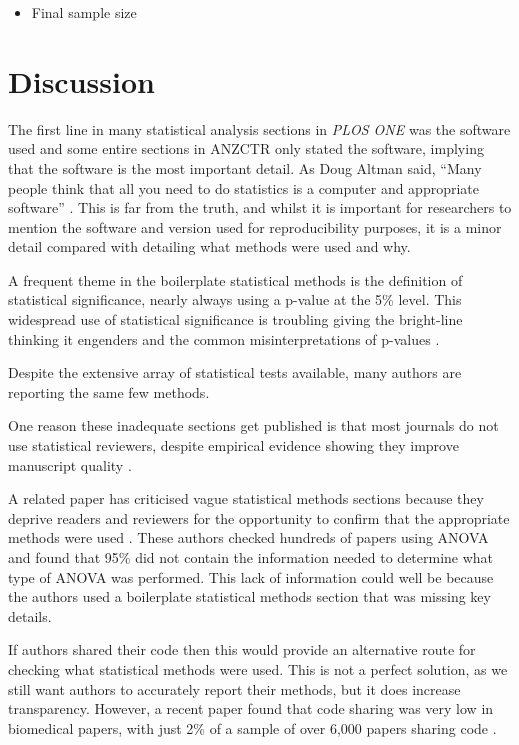 \documentclass[12pt]{article}
\providecommand{\tightlist}{%
  \setlength{\itemsep}{0pt}\setlength{\parskip}{0pt}}
\begin{document}
\begin{itemize}
\tightlist
\item
  Final sample size
\end{itemize}

\hypertarget{discussion}{%
\section{Discussion}\label{discussion}}

The first line in many statistical analysis sections in \emph{PLOS ONE}
was the software used and some entire sections in ANZCTR only stated the
software, implying that the software is the most important detail. As
Doug Altman said, ``Many people think that all you need to do statistics
is a computer and appropriate software'' \citep{Altman1994}. This is far
from the truth, and whilst it is important for researchers to mention
the software and version used for reproducibility purposes, it is a
minor detail compared with detailing what methods were used and why.

A frequent theme in the boilerplate statistical methods is the
definition of statistical significance, nearly always using a p-value at
the 5\% level. This widespread use of statistical significance is
troubling giving the bright-line thinking it engenders
\citep{McShane2019} and the common misinterpretations of p-values
\citep{Goodman2008}.

Despite the extensive array of statistical tests available, many authors
are reporting the same few methods.

One reason these inadequate sections get published is that most journals
do not use statistical reviewers, despite empirical evidence showing
they improve manuscript quality \citep{Hardwicke2020}.

A related paper has criticised vague statistical methods sections
because they deprive readers and reviewers for the opportunity to
confirm that the appropriate methods were used \citep{Weissgerber2018}.
These authors checked hundreds of papers using ANOVA and found that 95\%
did not contain the information needed to determine what type of ANOVA
was performed. This lack of information could well be because the
authors used a boilerplate statistical methods section that was missing
key details.

If authors shared their code then this would provide an alternative
route for checking what statistical methods were used. This is not a
perfect solution, as we still want authors to accurately report their
methods, but it does increase transparency. However, a recent paper
found that code sharing was very low in biomedical papers, with just 2\%
of a sample of over 6,000 papers sharing code \citep{Serghiou2021}.
\end{document}

